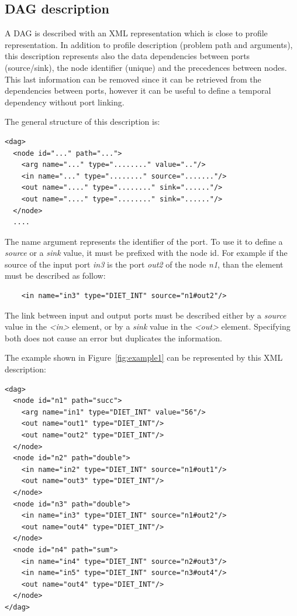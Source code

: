 \subsection{DAG description}
\label{sec:workflow_desc}

A DAG is described with an XML representation which is close
to \diet profile representation. In addition to profile description
(problem path and arguments), this description represents also the
data dependencies between ports (source/sink), the node identifier
(unique) and the precedences between nodes. This last information can
be removed since it can be retrieved from the dependencies between
ports, however it can be useful to define a temporal dependency
without port linking.

The general structure of this description is:

\begin{verbatim}
<dag>
  <node id="..." path="...">
    <arg name="..." type="........" value=".."/>
    <in name="..." type="........" source="......."/>
    <out name="...." type="........" sink="......"/>
    <out name="...." type="........" sink="......"/>
  </node>
  ....
\end{verbatim}

The name argument represents the identifier of the port. To use it to
define a \textit{source} or a \textit{sink} value, it must be prefixed
with the node id. For example if the source of the input port
\textit{in3} is the port \textit{out2} of the node \textit{n1}, than
the element must be described as follow:

\begin{verbatim}
    <in name="in3" type="DIET_INT" source="n1#out2"/>
\end{verbatim}

The link between input and output ports must be described either by
a \textit{source} value in the \textit{<in>} element, or by a
\textit{sink} value in the \textit{<out>} element. Specifying both
does not cause an error but duplicates the information.

The example shown in Figure~\ref{fig:example1} can be represented by
this XML description:

\begin{verbatim}
<dag>
  <node id="n1" path="succ">
    <arg name="in1" type="DIET_INT" value="56"/>
    <out name="out1" type="DIET_INT"/>
    <out name="out2" type="DIET_INT"/>
  </node>
  <node id="n2" path="double">
    <in name="in2" type="DIET_INT" source="n1#out1"/>
    <out name="out3" type="DIET_INT"/>
  </node>
  <node id="n3" path="double">
    <in name="in3" type="DIET_INT" source="n1#out2"/>
    <out name="out4" type="DIET_INT"/>
  </node>
  <node id="n4" path="sum">
    <in name="in4" type="DIET_INT" source="n2#out3"/>
    <in name="in5" type="DIET_INT" source="n3#out4"/>
    <out name="out4" type="DIET_INT"/>
  </node>
</dag>
\end{verbatim}

